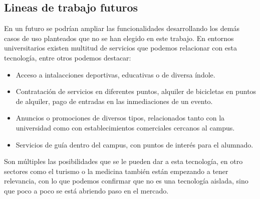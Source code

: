\subsection{Lineas de trabajo futuros}


En un futuro se podrían ampliar las funcionalidades desarrollando los demás casos de uso planteados que no se han elegido en este trabajo. En entornos universitarios existen multitud de servicios que podemos relacionar con esta tecnología, entre otros podemos destacar: 


\begin{itemize}
\item Acceso a intalacciones deportivas, educativas o de diversa índole.
\item Contratación de servicios en diferentes puntos, alquiler de bicicletas en puntos de alquiler, pago de entradas en las inmediaciones de un evento.
\item Anuncios o promociones de diversos tipos, relacionados tanto con la universidad como con establecimientos comerciales cercanos al campus.
\item Servicios de guía dentro del campus, con puntos de interés para el alumnado.
\end{itemize}


Son múltiples las posibilidades que se le pueden dar a esta tecnología, en otro sectores como el turismo o la medicina también están empezando a tener relevancia, con lo que podemos confirmar que no es una tecnología aislada, sino que poco a poco se está abriendo paso en el mercado.









